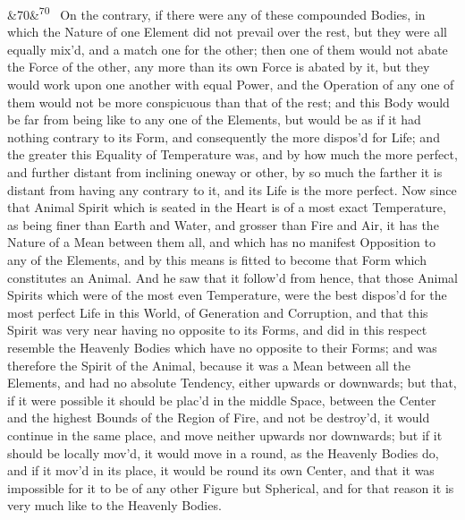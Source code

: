 \documentclass[12pt]{article}
\newcommand{\para}[1][]{\par\noindent\ifx&#1&\else\textsuperscript{\footnotesize #1}~\fi}
\begin{document}
\para[70] On the contrary, if there were any of these compounded Bodies, in which the Nature of one Element did not prevail over the rest, but they were all equally mix'd, and a match one for the other; then one of them would not abate the Force of the other, any more than its own Force is abated by it, but they would work upon one another with equal Power, and the Operation of any one of them would not be more conspicuous than that of the rest; and this Body would be far from being like to any one of the Elements, but would be as if it had nothing contrary to its Form, and consequently the more dispos'd for Life; and the greater this Equality of Temperature was, and by how much the more perfect, and further distant from inclining oneway or other, by so much the farther it is distant from having any contrary to it, and its Life is the more perfect. Now since that Animal Spirit which is seated in the Heart is of a most exact Temperature, as being finer than Earth and Water, and grosser than Fire and Air, it has the Nature of a Mean between them all, and which has no manifest Opposition to any of the Elements, and by this means is fitted to become that Form which constitutes an Animal. And he saw that it follow'd from hence, that those Animal Spirits which were of the most even Temperature, were the best dispos'd for the most perfect Life in this World, of Generation and Corruption, and that this Spirit was very near having no opposite to its Forms, and did in this respect resemble the Heavenly Bodies which have no opposite to their Forms; and was therefore the Spirit of the Animal, because it was a Mean between all the Elements, and had no absolute Tendency, either upwards or downwards; but that, if it were possible it should be plac'd in the middle Space, between the Center and the highest Bounds of the Region of Fire, and not be destroy'd, it would continue in the same place, and move neither upwards nor downwards; but if it should be locally mov'd, it would move in a round, as the Heavenly Bodies do, and if it mov'd in its place, it would be round its own Center, and that it was impossible for it to be of any other Figure but Spherical, and for that reason it is very much like to the Heavenly Bodies.
\end{document}
